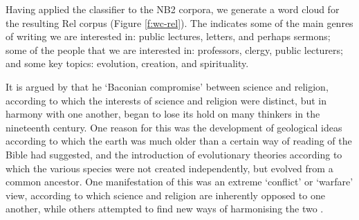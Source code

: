 \documentclass{article}
\begin{document}
Having applied the classifier to the NB2 corpora, we generate a word cloud for the resulting Rel corpus (Figure \ref{f:wc-rel}). The indicates some of the main genres of writing we are interested in: public lectures, letters, and perhaps sermons; some of the people that we are interested in: professors, clergy, public lecturers; and some key topics: evolution, creation, and spirituality.

It is argued by \cite{moore} that he `Baconian compromise' between science and religion, according to which the interests of science and religion were distinct, but in harmony with one another, began to lose its hold on many thinkers in the nineteenth century. One reason for this was the development of geological ideas according to which the earth was much older than a certain way of reading of the Bible had suggested, and the introduction of evolutionary theories according to which the various species were not created independently, but evolved from a common ancestor. One manifestation of this was an extreme `conflict' or `warfare' view, according to which science and religion are inherently opposed to one another, while others attempted to find new ways of harmonising the two \cite{dupree}.
\end{document}
